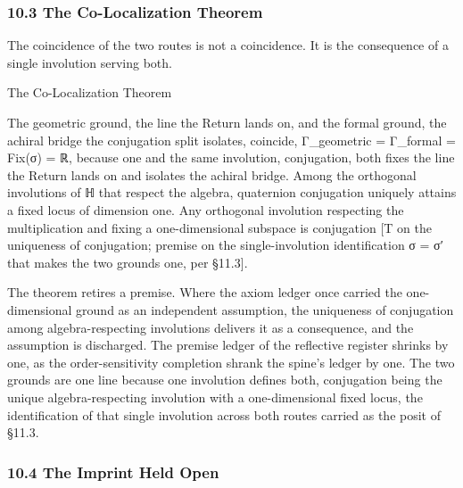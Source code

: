 \documentclass[10pt,twocolumn]{article}
\begin{document}
\hypertarget{the-co-localization-theorem}{%
\subsubsection{10.3 The Co-Localization
Theorem}\label{the-co-localization-theorem}}

The coincidence of the two routes is not a coincidence. It is the
consequence of a single involution serving both.

\begin{jbox}{The Co-Localization Theorem}

The geometric ground, the line the Return lands on, and the formal
ground, the achiral bridge the conjugation split isolates, coincide,
Γ\_geometric = Γ\_formal = Fix(σ) = ℝ, because one and the same
involution, conjugation, both fixes the line the Return lands on and
isolates the achiral bridge. Among the orthogonal involutions of ℍ that
respect the algebra, quaternion conjugation uniquely attains a fixed
locus of dimension one. Any orthogonal involution respecting the
multiplication and fixing a one-dimensional subspace is conjugation {[}T
on the uniqueness of conjugation; premise on the single-involution
identification σ = σ′ that makes the two grounds one, per §11.3{]}.

\end{jbox}

The theorem retires a premise. Where the axiom ledger once carried the
one-dimensional ground as an independent assumption, the uniqueness of
conjugation among algebra-respecting involutions delivers it as a
consequence, and the assumption is discharged. The premise ledger of the
reflective register shrinks by one, as the order-sensitivity completion
shrank the spine's ledger by one. The two grounds are one line because
one involution defines both, conjugation being the unique
algebra-respecting involution with a one-dimensional fixed locus, the
identification of that single involution across both routes carried as
the posit of §11.3.

\hypertarget{the-imprint-held-open}{%
\subsubsection{10.4 The Imprint Held Open}\label{the-imprint-held-open}}
\end{document}
